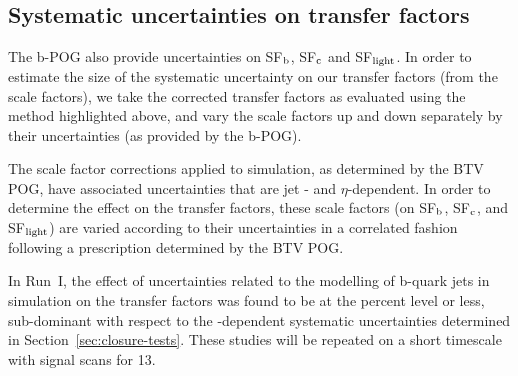 \subsection{Systematic uncertainties on transfer factors\label{sec:btag-syst}}

The b-POG also provide uncertainties on SF$_{\rm b}$, SF$_{\rm c}$ and
SF$_{\rm light}$. In order to estimate the size of the systematic
uncertainty on our transfer factors (from the scale factors), we
take the corrected transfer factors as evaluated using the method
highlighted above, and vary the scale factors up and down separately
by their uncertainties (as provided by the b-POG).

The scale factor corrections applied to simulation, as determined by
the BTV POG, have associated uncertainties that are jet \Pt- and
$\eta$-dependent. In order to determine the effect on the transfer
factors, these scale factors (on SF$_{\rm b}$, SF$_{\rm c}$, and SF$_{\rm light}$)
are varied according to their uncertainties in a correlated fashion
following a prescription determined by the BTV POG. 

In Run~I, the effect of uncertainties related to the modelling of
b-quark jets in simulation on the transfer factors was found to be at
the percent level or less, \ie sub-dominant with respect to the
\scalht-dependent systematic uncertainties determined in
Section~\ref{sec:closure-tests}. These studies will be repeated on
a short timescale with signal scans for 13\TeV.

